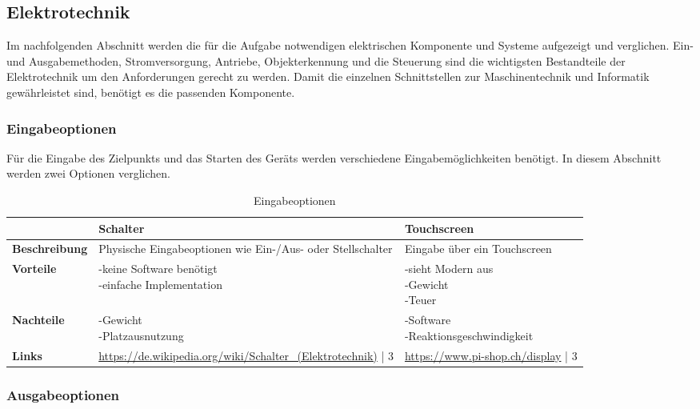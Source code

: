 \newpage
\subsection{Elektrotechnik}

Im nachfolgenden Abschnitt werden die für die Aufgabe notwendigen elektrischen Komponente und Systeme aufgezeigt und verglichen.  Ein- und Ausgabemethoden, Stromversorgung, Antriebe, Objekterkennung und die Steuerung sind die wichtigsten Bestandteile der Elektrotechnik um den Anforderungen gerecht zu werden. Damit die einzelnen Schnittstellen zur Maschinentechnik und Informatik gewährleistet sind, benötigt es die passenden Komponente.
\subsubsection{Eingabeoptionen}

Für die Eingabe des Zielpunkts und das Starten des Geräts werden verschiedene Eingabemöglichkeiten benötigt. In diesem Abschnitt werden zwei Optionen verglichen.

\begin{table}[H]
\centering
\small
\begin{tabularx}{\textwidth}{|l|X|X|}
\hline
  \textbf{} & \textbf{Schalter} & \textbf{Touchscreen} \\
  \hline
  \textbf{Beschreibung}  & Physische Eingabeoptionen wie Ein-/Aus- oder Stellschalter & Eingabe über ein Touchscreen\\
  \hline
  \textbf{Vorteile}  & \makecell{-keine Software benötigt\\-einfache Implementation} & \makecell{-sieht Modern aus \\ -Gewicht \\-Teuer}\\
  \hline
  \textbf{Nachteile} & \makecell{-Gewicht \\-Platzausnutzung} & \makecell{-Software\\-Reaktionsgeschwindigkeit}\\
  \hline
  \textbf{Links} &  \url{https://de.wikipedia.org/wiki/Schalter_(Elektrotechnik)} | 3 & \url{https://www.pi-shop.ch/display} | 3\\
  \hline
\end{tabularx}
\caption{Eingabeoptionen}
\label{table:inputs-compare}
\end{table}

\subsubsection{Ausgabeoptionen}

